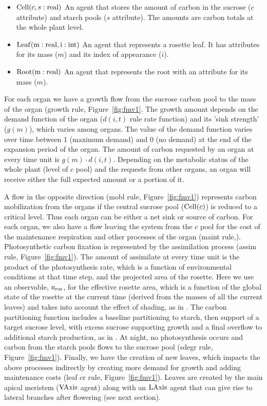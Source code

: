 %
\begin{itemize}
\item
  \(\mathrm{Cell}(c,s:\mathrm{real})\) An agent that stores the amount of
  carbon in the sucrose (\(c\) attribute) and starch pools (\(s\)
  attribute). The amounts are carbon totals at the whole plant level.
\item
  \(\mathrm{Leaf}(\mathrm{m}:\mathrm{real},\mathrm{i}:\mathrm{int})\) An agent that represents a
  rosette leaf. It has attributes for its mass (\(m\)) and its index of
  appearance (\(i\)).
\item
  \(\mathrm{Root}(\mathrm{m}:\mathrm{real})\) An agent that represents the root with
  an attribute for its mass (\(m\)).
\end{itemize}

For each organ we have a growth flow from the sucrose carbon pool to the mass of
the organ (\textsf{growth} rule, Figure~\ref{fig:fmv1}. The growth amount
depends on the demand function of the organ (\(d(i,t)\) rule rate function) and
its 'sink strength' (\(g(m)\)), which varies among organs. The value of the
demand function varies over time between 1 (maximum demand) and 0 (no demand) at
the end of the expansion period of the organ. The amount of carbon requested by
an organ at every time unit is \(g( m ) \cdot d(i,t)\). Depending on the
metabolic status of the whole plant (level of \(c\) pool) and the requests from
other organs, an organ will receive either the full expected amount or a portion
of it.

A flow in the opposite direction (\textsf{mobl} rule, Figure~\ref{fig:fmv1})
represents carbon mobilization from the organs if the central sucrose pool
(\(\mathrm{Cell}(c)\)) is reduced to a critical level. Thus each organ can be either
a net sink or source of carbon. For each organ, we also have a flow leaving the
system from the \(c\) pool for the cost of the maintenance respiration and other
processes of the organ (maint rule,). Photosynthetic carbon fixation is
represented by the assimilation process (\textsf{assim} rule,
Figure~\ref{fig:fmv1}). The amount of assimilate at every time unit is the
product of the photosynthesis rate, which is a function of environmental
conditions at that time step, and the projected area of the rosette. Here we use
an observable, \(a_{\mathrm{ros}}\), for the effective rosette area, which is a
function of the global state of the rosette at the current time (derived from
the masses of all the current leaves) and takes into account the effect of
shading, as in \citet{chew_multiscale_2014}. The carbon partitioning function
includes a baseline partitioning to starch, then support of a target sucrose
level, with excess sucrose supporting growth and a final overflow to additional
starch production, as in \citet{chew_multiscale_2014}. At night, no
photosynthesis occurs and carbon from the starch pools flows to the sucrose pool
(\textsf{sdegr} rule, Figure~\ref{fig:fmv1}). Finally, we have the creation of
new leaves, which impacts the above processes indirectly by creating more demand
for growth and adding maintenance costs (\textsf{leaf cr} rule,
Figure~\ref{fig:fmv1}). Leaves are created by the main apical meristem
(\(\mathrm{VAxis}\) agent) along with an \(\mathrm{LAxis}\) agent that can give rise to
lateral branches after flowering (see next section).

